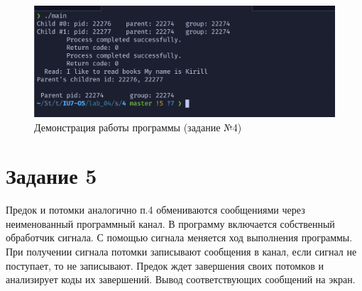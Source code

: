 \documentclass[a4paper,14pt]{article}
\begin{document}
\begin{figure}[ht]
	\centering
	\includegraphics[scale=0.7]{4.png}
	\caption{Демонстрация работы программы (задание №4)}
	\label{fig:4}
\end{figure}

\clearpage
\section*{Задание 5}

Предок и потомки аналогично п.4 обмениваются сообщениями через неименованный программный канал. В программу включается собственный обработчик сигнала. С помощью сигнала меняется ход выполнения программы. При получении сигнала потомки записывают сообщения в канал, если сигнал не поступает, то не записывают. Предок ждет завершения своих потомков и анализирует коды их завершений. Вывод соответствующих сообщений на экран.
\end{document}
